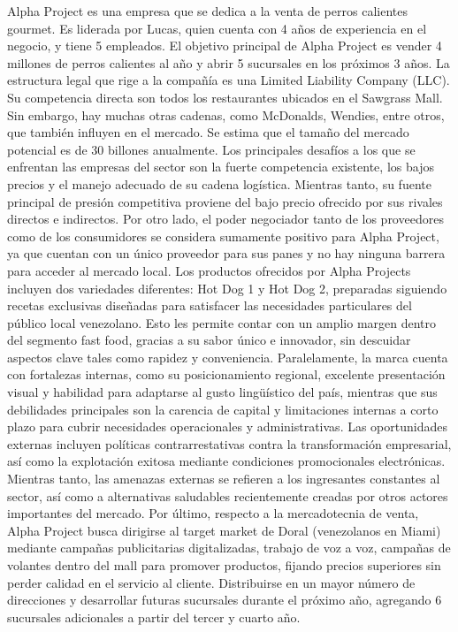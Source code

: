 Alpha Project es una empresa que se dedica a la venta de perros calientes gourmet. Es liderada por Lucas, quien cuenta con 4 años de experiencia en el negocio, y tiene 5 empleados. El objetivo principal de Alpha Project es vender 4 millones de perros calientes al año y abrir 5 sucursales en los próximos 3 años. La estructura legal que rige a la compañía es una Limited Liability Company (LLC). Su competencia directa son todos los restaurantes ubicados en el Sawgrass Mall. Sin embargo, hay muchas otras cadenas, como McDonalds, Wendies, entre otros, que también influyen en el mercado. Se estima que el tamaño del mercado potencial es de 30 billones anualmente.
Los principales desafíos a los que se enfrentan las empresas del sector son la fuerte competencia existente, los bajos precios y el manejo adecuado de su cadena logística. Mientras tanto, su fuente principal de presión competitiva proviene del bajo precio ofrecido por sus rivales directos e indirectos. Por otro lado, el poder negociador tanto de los proveedores como de los consumidores se considera sumamente positivo para Alpha Project, ya que cuentan con un único proveedor para sus panes y no hay ninguna barrera para acceder al mercado local.
Los productos ofrecidos por Alpha Projects incluyen dos variedades diferentes: Hot Dog 1 y Hot Dog 2, preparadas siguiendo recetas exclusivas diseñadas para satisfacer las necesidades particulares del público local venezolano. Esto les permite contar con un amplio margen dentro del segmento fast food, gracias a su sabor único e innovador, sin descuidar aspectos clave tales como rapidez y conveniencia. Paralelamente, la marca cuenta con fortalezas internas, como su posicionamiento regional, excelente presentación visual y habilidad para adaptarse al gusto lingüístico del país, mientras que sus debilidades principales son la carencia de capital y limitaciones internas a corto plazo para cubrir necesidades operacionales y administrativas.
Las oportunidades externas incluyen políticas contrarrestativas contra la transformación empresarial, así como la explotación exitosa mediante condiciones promocionales electrónicas. Mientras tanto, las amenazas externas se refieren a los ingresantes constantes al sector, así como a alternativas saludables recientemente creadas por otros actores importantes del mercado.
Por último, respecto a la mercadotecnia de venta, Alpha Project busca dirigirse al target market de Doral (venezolanos en Miami) mediante campañas publicitarias digitalizadas, trabajo de voz a voz, campañas de volantes dentro del mall para promover productos, fijando precios superiores sin perder calidad en el servicio al cliente. Distribuirse en un mayor número de direcciones y desarrollar futuras sucursales durante el próximo año, agregando 6 sucursales adicionales a partir del tercer y cuarto año.
